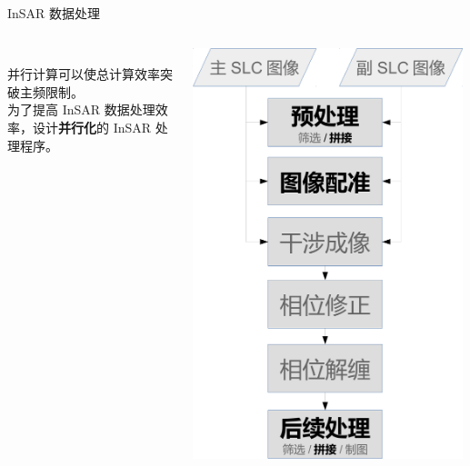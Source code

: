 \documentclass{beamer}
\begin{document}
\begin{frame}{InSAR 数据处理}
\begin{columns}
\begin{column}{0.6\textwidth}
\begin{footnotesize}
            ~\\
            并行计算可以使总计算效率突破主频限制。\\
            为了提高 InSAR 数据处理效率，设计\textbf{并行化}的 InSAR 处理程序。
            \end{footnotesize}
        \end{column}
        \begin{column}{0.4\textwidth}
            \includegraphics[width=0.99\textwidth]{figures/process.pdf}
        \end{column}
    \end{columns}
\end{frame}
\end{document}
